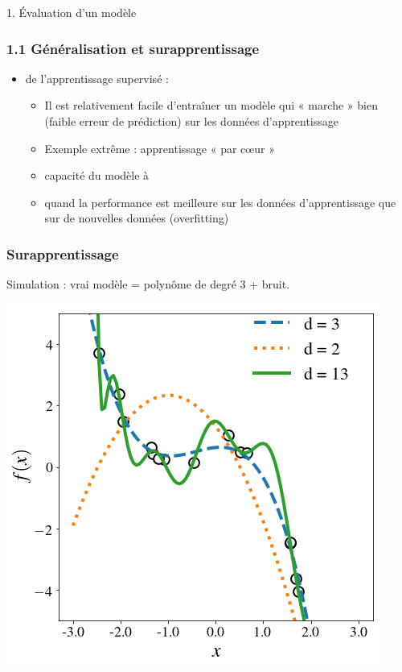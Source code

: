 \begin{frame}
  \begin{center}
    \large{1. Évaluation d'un modèle}
  \end{center}
\end{frame}


\begin{frame}
  \frametitle{1.1 Généralisation et surapprentissage}
  \begin{itemize}
  \item[]  de l'apprentissage supervisé :
    \begin{itemize}
    \item Il est relativement facile d'entraîner un modèle qui « marche » bien
      (faible erreur de prédiction) sur les données d'apprentissage
    \item[] Exemple extrême : apprentissage « par c\oe{}ur »
      \vspace{.5em}
    \pause
    \item {} capacité du modèle à  
      \vspace{.5em}
    \pause
    \item {} quand la performance est meilleure sur
      les données d'apprentissage que sur de nouvelles données \textcolor{gray!70}{(overfitting)}
    \end{itemize}
  \end{itemize}
\end{frame}

\begin{frame}
  \frametitle{Surapprentissage}
  Simulation : vrai modèle = polynôme de degré 3 + bruit.
  \begin{center}
    \includegraphics[width=.7\textwidth]{figures/overfit_regr}
  \end{center}
\end{frame}

